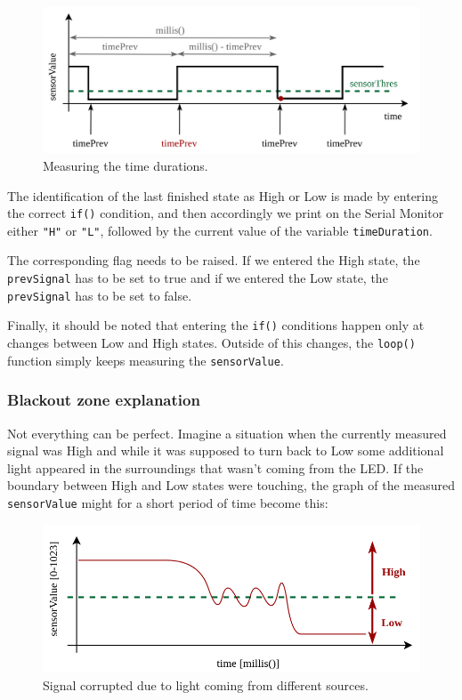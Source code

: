 \documentclass[10pt]{report}
\begin{document}
\begin{figure}[H]
\centering\includegraphics[width=14.5cm]{timedurations}
\caption{Measuring the time durations.}				
\label{fig:timedur}
\end{figure}

The identification of the last finished state as High or Low is made by entering the correct \verb|if()| condition, and then accordingly we print on the Serial Monitor either \verb|"H"| or \verb|"L"|, followed by the current value of the variable \verb|timeDuration|.

The corresponding flag needs to be raised. If we entered the High state, the \verb|prevSignal| has to be set to true and if we entered the Low state, the \verb|prevSignal| has to be set to false.

Finally, it should be noted that entering the \verb|if()| conditions happen only at changes between Low and High states. Outside of this changes, the \verb|loop()| function simply keeps measuring the \verb|sensorValue|.

\subsubsection{Blackout zone explanation}

Not everything can be perfect. Imagine a situation when the currently measured signal was High and while it was supposed to turn back to Low some additional light appeared in the surroundings that wasn't coming from the LED. If the boundary between High and Low states were touching, the graph of the measured \texttt{sensorValue} might for a short period of time become this:

\begin{figure}[H]
\centering\includegraphics[width=14.5cm]{blackoutZone.png}
\caption{Signal corrupted due to light coming from different sources.}				
\label{fig:blackoutzone}
\end{figure}
\end{document}
